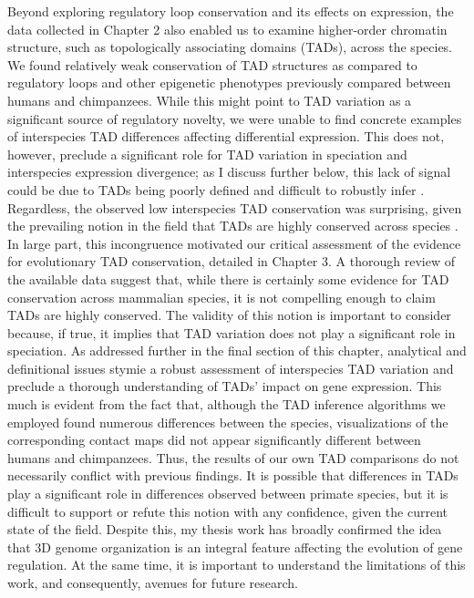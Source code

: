 Beyond exploring regulatory loop conservation and its effects on expression, the data collected in Chapter 2 also enabled us to examine higher-order chromatin structure, such as topologically associating domains (TADs), across the species. We found relatively weak conservation of TAD structures as compared to regulatory loops and other epigenetic phenotypes previously compared between humans and chimpanzees. While this might point to TAD variation as a significant source of regulatory novelty, we were unable to find concrete examples of interspecies TAD differences affecting differential expression. This does not, however, preclude a significant role for TAD variation in speciation and interspecies expression divergence; as I discuss further below, this lack of signal could be due to TADs being poorly defined and difficult to robustly infer \cite{Dali.2017}. Regardless, the observed low interspecies TAD conservation was surprising, given the prevailing notion in the field that TADs are highly conserved across species \cite{Dixon.2012, Rao.2014}. In large part, this incongruence motivated our critical assessment of the evidence for evolutionary TAD conservation, detailed in Chapter 3. A thorough review of the available data suggest that, while there is certainly some evidence for TAD conservation across mammalian species, it is not compelling enough to claim TADs are highly conserved. The validity of this notion is important to consider because, if true, it implies that TAD variation does not play a significant role in speciation. As addressed further in the final section of this chapter, analytical and definitional issues stymie a robust assessment of interspecies TAD variation and preclude a thorough understanding of TADs' impact on gene expression. This much is evident from the fact that, although the TAD inference algorithms we employed found numerous differences between the species, visualizations of the corresponding contact maps did not appear significantly different between humans and chimpanzees. Thus, the results of our own TAD comparisons do not necessarily conflict with previous findings. It is possible that differences in TADs play a significant role in differences observed between primate species, but it is difficult to support or refute this notion with any confidence, given the current state of the field. Despite this, my thesis work has broadly confirmed the idea that 3D genome organization is an integral feature affecting the evolution of gene regulation. At the same time, it is important to understand the limitations of this work, and consequently, avenues for future research.

